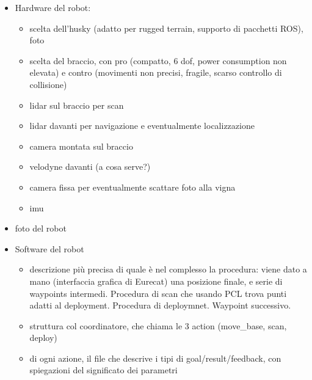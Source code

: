 \begin{itemize}
\item Hardware del robot:
		\begin{itemize}
			\item scelta dell'husky (adatto per rugged terrain, supporto di pacchetti ROS), foto
			\item scelta del braccio, con pro (compatto, 6 dof, power consumption non elevata) e contro (movimenti non precisi, fragile, scarso controllo di collisione)
			\item lidar sul braccio per scan
			\item lidar davanti per navigazione e eventualmente localizzazione
			\item camera montata sul braccio
			\item velodyne davanti (a cosa serve?)
			\item camera fissa per eventualmente scattare foto alla vigna
			\item imu
		\end{itemize}
	\item foto del robot 

\item Software del robot
	\begin{itemize}
		\item descrizione più precisa di quale è nel complesso la procedura: viene dato a mano (interfaccia grafica di Eurecat) una posizione finale, e serie di waypoints intermedi. Procedura di scan che usando PCL trova punti adatti al deployment. Procedura di deploymnet. Waypoint successivo.
		\item struttura col coordinatore, che chiama le 3 action (move\_base, scan, deploy)
		\item di ogni azione, il file che descrive i tipi di goal/result/feedback, con spiegazioni del significato dei parametri
	\end{itemize}
\end{itemize}
